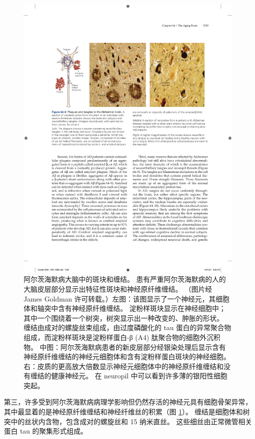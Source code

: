 \begin{figure}[htbp]
	\centering
	\includegraphics[width=0.9\linewidth]{chap64/fig_64_9}
	\caption{阿尔茨海默病大脑中的斑块和缠结。 患有严重阿尔茨海默病的人的大脑皮层部分显示出特征性斑块和神经原纤维缠结。 （图片经 James Goldman 许可转载。）左图：该图显示了一个神经元，其细胞体和轴突中含有神经原纤维缠结。 淀粉样斑块显示在神经细胞中； 其中一个围绕着一个树突，树突显示出一种改变的、肿胀的形状。 缠结由成对的螺旋丝束组成，由过度磷酸化的 tau 蛋白的异常聚合物组成，而淀粉样斑块是淀粉样蛋白-β (A4) 肽聚合物的细胞外沉积物。 中图：阿尔茨海默病患者的新皮层部分经银染处理后显示含有神经原纤维缠结的神经元细胞体和含有淀粉样蛋白斑块的神经细胞。 右：皮质的更高放大倍数显示神经元细胞体中的神经原纤维缠结和没有缠结的健康神经元。 在 neuropil 中可以看到许多薄的银阳性细胞突起。}
	\label{fig:64_9}
\end{figure}


第三，许多受到阿尔茨海默病病理学影响但仍然存活的神经元具有细胞骨架异常，其中最显着的是神经原纤维缠结和神经纤维丝的积累（图 \ref{fig:64_9}）。
缠结是细胞体和树突中的丝状内含物，包含成对的螺旋丝和 15 纳米直丝。
这些细丝由正常微管相关蛋白 tau 的聚集形式组成。


